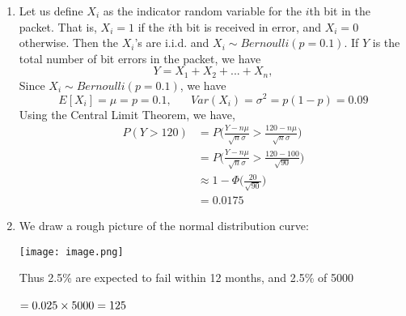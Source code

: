 \documentclass{book}
\begin{document}
\begin{enumerate}
	\item Let us define $X_i$ as the indicator random variable for the $i$th bit in the packet. That is, $X_i=1$ if the $i$th bit is received in error, and $X_i=0$ otherwise. Then the $X_i$'s are i.i.d. and $X_i \sim Bernoulli(p=0.1)$. If $Y$ is the total number of bit errors in the packet, we have
\begin{equation*}
        Y = X_1 + X_2 + ... + X_n,
\end{equation*}
Since $X_i \sim Bernoulli(p=0.1)$, we have
\begin{equation*}
    E[X_i] = \mu = p = 0.1, \hspace{20pt} Var(X_i) = \sigma^2 = p(1-p) = 0.09
\end{equation*}
Using the Central Limit Theorem, we have,
\begin{align*}
    P(Y>120) &= P\Bigg(\frac{Y-n\mu}{\sqrt{n}\sigma} > \frac{120-n\mu}{\sqrt{n}\sigma}\Bigg)\\
    &= P\Bigg(\frac{Y-n\mu}{\sqrt{n}\sigma} > \frac{120-100}{\sqrt{90}}\Bigg)\\
    &\approx 1 - \Phi\bigg(\frac{20}{\sqrt{90}}\bigg)\\
    &= 0.0175
\end{align*}
	\item We draw a rough picture of the normal distribution curve:\\
	\begin{center}
		\texttt{[image: image.png]}
	\end{center}
	Thus 2.5\% are expected to fail within 12 months, and 2.5\% of 5000\\\\
	$= 0.025 \times 5000\\\\
	= 125$  
\end{enumerate}
\end{document}
